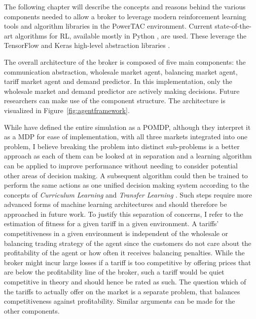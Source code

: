 The following chapter will describe the concepts and reasons behind the various components needed to allow a broker to
leverage modern reinforcement learning tools and algorithm libraries in the \ac{PowerTAC} environment. Current state-of-the-art
algorithms for \ac{RL}, available mostly in Python \citep{baselines}, are used. These leverage the TensorFlow and
Keras high-level abstraction libraries \citep{plappert2016kerasrl}.


The overall architecture of the broker is composed of five main components: the communication abstraction, wholesale market
agent, balancing market agent, tariff market agent and demand predictor. In this implementation, only the wholesale
market and demand predictor are actively making decisions. Future researchers can make use of the component structure.
The architecture is visualized in Figure~\ref{fig:agentframework}.

While \citep{tactexurieli2016mdp} have defined the entire simulation as a \ac{POMDP}, although they interpret it as a
\ac{MDP} for ease of implementation, with all three markets integrated into one problem, I believe breaking the problem
into distinct sub-problems is a better approach as each of them can be looked at in separation and a learning algorithm
can be applied to improve performance without needing to consider potential other areas of decision making. A
subsequent algorithm could then be trained to perform the same actions as one unified decision making system according
to the concepts of \emph{Curriculum Learning}\citep{matiisen2017teacher} and \emph{Transfer Learning}
\citep{parisotto2015actor}. Such steps require more advanced forms of machine learning architectures and should
therefore be approached in future work.
To justify this separation of concerns, I refer to the estimation of fitness for a given tariff in a given environment.
A tariffs' competitiveness in a given environment is independent of the wholesale or balancing trading strategy of the
agent since the customers do not care about the profitability of the agent or how often it receives balancing penalties.
While the broker might incur large losses if a tariff is too competitive by offering prices that are below the
profitability line of the broker, such a tariff would be quiet competitive in theory and should hence be rated
as such. The question which of the tariffs to actually offer on the market is a separate problem, that balances
competitiveness against profitability. Similar arguments can be made for the other components.

